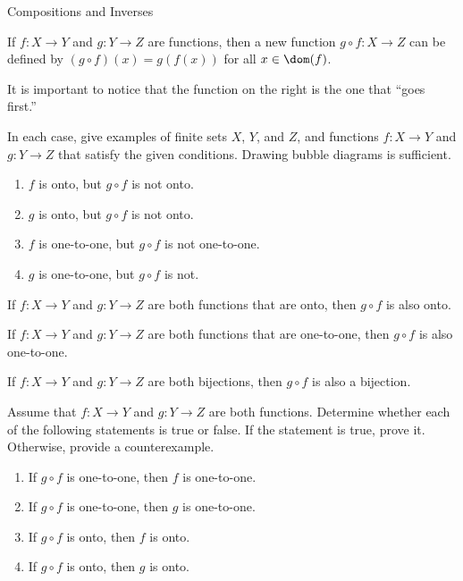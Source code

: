 \begin{section}{Compositions and Inverses}

\begin{definition}
If $f:X\to Y$ and $g:Y\to Z$ are functions, then a new function $g\circ f:X\to Z$ can be defined by $(g\circ f)(x)=g(f(x))$ for all $x\in\dom(f)$.
\end{definition}

It is important to notice that the function on the right is the one that ``goes first.''

\begin{exercise}
In each case, give examples of finite sets $X$, $Y$, and $Z$, and functions $f:X\to Y$ and $g:Y\to Z$ that satisfy the given conditions.  Drawing bubble diagrams is sufficient.
\begin{enumerate}[label=\textrm{(\alph*)}]
\item $f$ is onto, but $g\circ f$ is not onto.
\item $g$ is onto, but $g\circ f$ is not onto.
\item $f$ is one-to-one, but $g\circ f$ is not one-to-one.
\item $g$ is one-to-one, but $g\circ f$ is not.
\end{enumerate}
\end{exercise}

\begin{theorem}
If $f:X\to Y$ and $g:Y\to Z$ are both functions that are onto, then $g\circ f$ is also onto.
\end{theorem}

\begin{theorem}
If $f:X\to Y$ and $g:Y\to Z$ are both functions that are one-to-one, then $g\circ f$ is also one-to-one.
\end{theorem}

\begin{corollary}
If $f:X\to Y$ and $g:Y\to Z$ are both bijections, then $g\circ f$ is also a bijection.
\end{corollary}

\begin{problem}
Assume that $f:X\to Y$ and $g:Y\to Z$ are both functions.  Determine whether each of the following statements is true or false. If the statement is true, prove it.  Otherwise, provide a counterexample.
\begin{enumerate}[label=\textrm{(\alph*)}]
\item If $g\circ f$ is one-to-one, then $f$ is one-to-one.
\item If $g\circ f$ is one-to-one, then $g$ is one-to-one.
\item If $g\circ f$ is onto, then $f$ is onto.
\item If $g\circ f$ is onto, then $g$ is onto.
\end{enumerate}
\end{problem}


\end{section}
